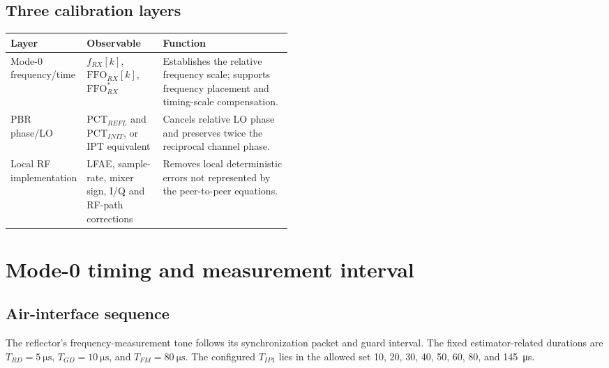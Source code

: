 \documentclass[10pt,a4paper]{article}
\newcommand{\FFO}{\mathrm{FFO}}
\newcommand{\PCT}{\mathrm{PCT}}
\begin{document}
\subsection{Three calibration layers}
\begin{tabularx}{\linewidth}{@{}p{0.20\linewidth}p{0.27\linewidth}X@{}}
\toprule Layer & Observable & Function \\
\midrule
Mode-0 frequency/time & $f_{RX}[k]$, $\FFO_{RX}[k]$, $\FFO_{RX}^{*}$ & Establishes the relative frequency scale; supports frequency placement and timing-scale compensation.\\
PBR phase/LO & $\PCT_{REFL}$ and $\PCT_{INIT}$, or IPT equivalent & Cancels relative LO phase and preserves twice the reciprocal channel phase.\\
Local RF implementation & LFAE, sample-rate, mixer sign, I/Q and RF-path corrections & Removes local deterministic errors not represented by the peer-to-peer equations.\\
\bottomrule
\end{tabularx}

\section{Mode-0 timing and measurement interval}
\subsection{Air-interface sequence}
The reflector's frequency-measurement tone follows its synchronization packet and guard interval. The fixed estimator-related durations are $T_{RD}=\SI{5}{\micro\second}$, $T_{GD}=\SI{10}{\micro\second}$, and $T_{FM}=\SI{80}{\micro\second}$. The configured $T_{IP1}$ lies in the allowed set 10, 20, 30, 40, 50, 60, 80, and \SI{145}{\micro\second}.
\end{document}
